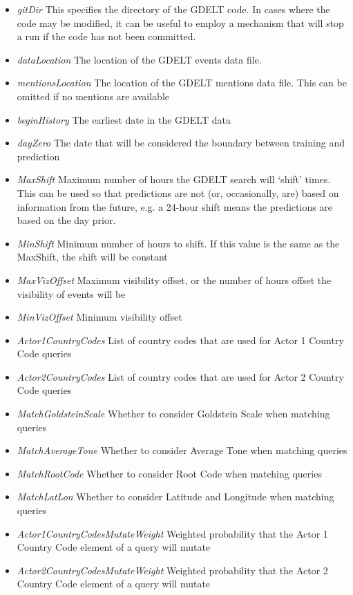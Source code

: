 \begin{itemize}
\item \textit{gitDir} This specifies the directory of the GDELT code. In cases where the code may be modified, it can be useful to employ a mechanism that will stop a run if the code has not been committed.
\item \textit{dataLocation} The location of the GDELT events data file.
\item \textit{mentionsLocation} The location of the GDELT mentions data file. This can be omitted if no mentions are available
\item \textit{beginHistory} The earliest date in the GDELT data
\item \textit{dayZero} The date that will be considered the boundary between training and prediction  
\item \textit{MaxShift} Maximum number of hours the GDELT search will `shift' times. This can be used so that predictions are not (or, occasionally, are) based on information from the future, e.g. a 24-hour shift means the predictions are based on the day prior.
\item \textit{MinShift} Minimum number of hours to shift. If this value is the same as the MaxShift, the shift will be constant
\item \textit{MaxVizOffset} Maximum visibility offset, or the number of hours offset the visibility of events will be
\item \textit{MinVizOffset} Minimum visibility offset
\item \textit{Actor1CountryCodes} List of country codes that are used for Actor 1 Country Code queries
\item \textit{Actor2CountryCodes} List of country codes that are used for Actor 2 Country Code queries
\item \textit{MatchGoldsteinScale} Whether to consider Goldstein Scale when matching queries
\item \textit{MatchAverageTone} Whether to consider Average Tone when matching queries
\item \textit{MatchRootCode} Whether to consider Root Code when matching queries
\item \textit{MatchLatLon} Whether to consider Latitude and Longitude when matching queries
\item \textit{Actor1CountryCodesMutateWeight} Weighted probability that the Actor 1 Country Code element of a query will mutate
\item \textit{Actor2CountryCodesMutateWeight} Weighted probability that the Actor 2 Country Code element of a query will mutate

\end{itemize}
